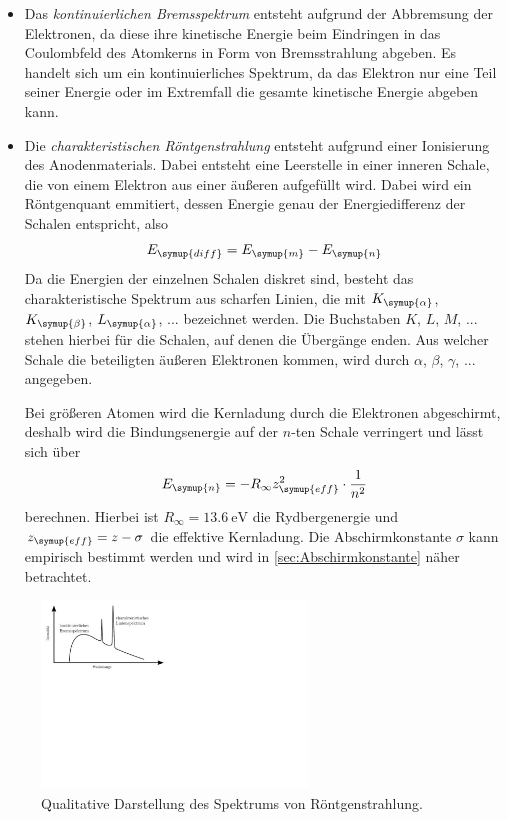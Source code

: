\begin{itemize}
    \item Das \textit{kontinuierlichen Bremsspektrum} entsteht aufgrund der Abbremsung der Elektronen,
    da diese ihre kinetische Energie beim Eindringen in das Coulombfeld des Atomkerns in Form von Bremsstrahlung
    abgeben. Es handelt sich um ein kontinuierliches Spektrum, da das Elektron nur eine Teil seiner Energie oder
    im Extremfall die gesamte kinetische Energie abgeben kann.

    \item Die \textit{charakteristischen Röntgenstrahlung} entsteht aufgrund einer Ionisierung des Anodenmaterials.
    Dabei entsteht eine Leerstelle in einer inneren Schale, die von einem Elektron aus einer äußeren aufgefüllt wird.
    Dabei wird ein Röntgenquant emmitiert, dessen Energie genau der Energiedifferenz der Schalen entspricht, also
    \begin{equation*}
        E_{\symup{diff}}=E_{\symup{m}}-E_{\symup{n}}
    \end{equation*}
    Da die Energien der einzelnen Schalen diskret sind, besteht das charakteristische Spektrum aus scharfen Linien, die
    mit $K_{\symup{\alpha}}$, $K_{\symup{\beta}}$, $L_{\symup{\alpha}}$, ... bezeichnet werden. Die Buchstaben $K$, $L$, $M$, ...
    stehen hierbei für die Schalen, auf denen die Übergänge enden. Aus welcher Schale die beteiligten äußeren Elektronen
    kommen, wird durch $\alpha$, $\beta$, $\gamma$, ... angegeben.

    Bei größeren Atomen wird die Kernladung durch die Elektronen abgeschirmt, deshalb wird die Bindungsenergie auf der
    $n$-ten Schale verringert und lässt sich über
    \begin{equation}
        E_{\symup{n}}=-R_{\infty}z_{\symup{eff}}^{2}\cdot\frac{1}{n^2} \label{eq:Rydbergenergie}
    \end{equation}
    berechnen. Hierbei ist $R_{\infty}=\qty{13.6}{\electronvolt}$ die Rydbergenergie und $z_{\symup{eff}}=z-\sigma$
    die effektive Kernladung.
    Die Abschirmkonstante $\sigma$ kann empirisch bestimmt werden und wird in \autoref{sec:Abschirmkonstante}
    näher betrachtet.  
\end{itemize}

\begin{figure}[H]
    \centering
    \includegraphics[height=5cm]{content/pics/bremsspektrum.pdf}
    \caption{Qualitative Darstellung des Spektrums von Röntgenstrahlung.\cite{Bremsspektrum}}
    \label{fig:Roentgen}
\end{figure}


